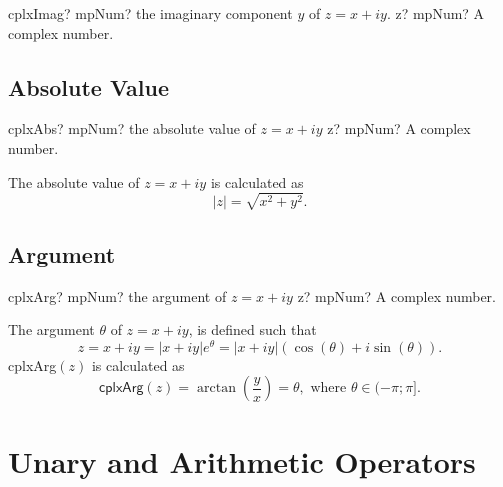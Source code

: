 \begin{mpFunctionsExtract}
	\mpFunctionOne
	{cplxImag? mpNum? the imaginary component $y$ of $z=x+iy$.}
	{z? mpNum? A complex number.}
\end{mpFunctionsExtract}




\subsection{Absolute Value}

\begin{mpFunctionsExtract}
	\mpFunctionOne
	{cplxAbs? mpNum? the absolute value of $z=x+iy$}
	{z? mpNum? A complex number.}
\end{mpFunctionsExtract}


\vspace{0.3cm}
The absolute value of $z=x+iy$ is calculated as
\begin{equation}
	|z|=\sqrt{x^2+y^2}.
\end{equation}



\subsection{Argument}

\begin{mpFunctionsExtract}
	\mpFunctionOne
	{cplxArg? mpNum? the argument of $z=x+iy$}
	{z? mpNum? A complex number.}
\end{mpFunctionsExtract}


\vspace{0.3cm}
The argument $\theta$ of $z=x+iy$, is defined such that
\begin{equation}
	z=x+iy = |x+iy|e^{\theta} = |x+iy|(\cos(\theta)+ i \sin(\theta)).
\end{equation}
\textsf{cplxArg$(z)$} is calculated as
\begin{equation}
	\textsf{cplxArg$(z)$}  = \arctan\left(\frac{y}{x} \right) = \theta, \text{ where } \theta \in (-\pi;\pi].
\end{equation}







\section{Unary and Arithmetic Operators }
\label{ArithmeticOperatorsCplx}

